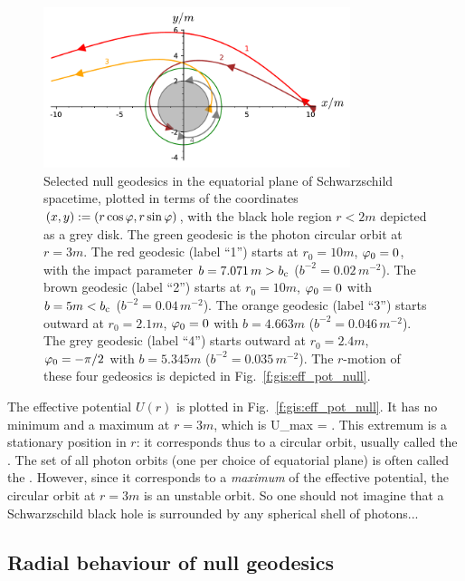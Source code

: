 \begin{figure}
\centerline{\includegraphics[width=0.8\textwidth]{ges_null_geod.pdf}}
\caption[]{\label{f:gis:null_geod} \footnotesize
Selected null geodesics in the equatorial plane of Schwarzschild spacetime,
plotted in terms
of the coordinates $(x,y) := (r\cos\varphi, r\sin\varphi)$, with the black hole
region $r<2m$ depicted as a grey disk.
The green geodesic is the photon circular orbit at $r=3m$.
The red geodesic (label ``1'') starts at $r_0=10 m$, $\varphi_0=0$, with
the impact parameter $b = 7.071 \, m > b_{\rm c}$ ($b^{-2} = 0.02\, m^{-2}$).
The brown geodesic (label ``2'') starts at $r_0=10 m$, $\varphi_0=0$ with $b = 5 m < b_{\rm c}$ ($b^{-2} = 0.04\, m^{-2}$).
The orange geodesic (label ``3'') starts outward at $r_0=2.1 m$, $\varphi_0=0$ with $b = 4.663 m$ ($b^{-2} = 0.046\, m^{-2}$).
The grey geodesic (label ``4'') starts outward at $r_0=2.4 m$, $\varphi_0=-\pi/2$ with $b = 5.345 m$ ($b^{-2} = 0.035\, m^{-2}$).
The $r$-motion of these four gedeosics is depicted in
Fig.~\ref{f:gis:eff_pot_null}.}
\end{figure}

The effective potential $U(r)$ is plotted in Fig.~\ref{f:gis:eff_pot_null}.
It has no minimum and a maximum at $r=3m$, which is
\be \label{e:ges:U_max}
    U_{\rm max} =  .
\ee
This extremum is a stationary position in $r$: it corresponds thus to a circular
orbit, usually called the .
The set of all photon orbits (one per choice of equatorial plane) is often
called the .
However, since it corresponds to a \emph{maximum} of the effective potential, the circular
orbit at $r=3m$ is an unstable orbit. So one should not imagine that a
Schwarzschild black hole is surrounded by any spherical shell of photons...


\subsection{Radial behaviour of null geodesics} \label{s:ges:null_radial_behav}

